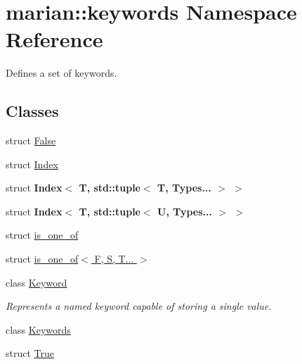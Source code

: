 \hypertarget{namespacemarian_1_1keywords}{}\section{marian\+:\+:keywords Namespace Reference}
\label{namespacemarian_1_1keywords}


Defines a set of keywords.  


\subsection*{Classes}
\begin{DoxyCompactItemize}
\item 
struct \hyperlink{namespacemarian_1_1keywords_d3/d3c/structmarian_1_1keywords_1_1False}{False}
\item 
struct \hyperlink{namespacemarian_1_1keywords_df/dc1/structmarian_1_1keywords_1_1Index}{Index}
\item 
struct {\bfseries Index$<$ T, std\+::tuple$<$ T, Types... $>$ $>$}
\item 
struct {\bfseries Index$<$ T, std\+::tuple$<$ U, Types... $>$ $>$}
\item 
struct \hyperlink{structmarian_1_1keywords_1_1is__one__of}{is\+\_\+one\+\_\+of}
\item 
struct \hyperlink{structmarian_1_1keywords_1_1is__one__of_3_01F_00_01S_00_01T_8_8_8_01_4}{is\+\_\+one\+\_\+of$<$ F, S, T... $>$}
\item 
class \hyperlink{classmarian_1_1keywords_1_1Keyword}{Keyword}
\begin{DoxyCompactList}\small\item\em Represents a named keyword capable of storing a single value. \end{DoxyCompactList}\item 
class \hyperlink{classmarian_1_1keywords_1_1Keywords}{Keywords}
\item 
struct \hyperlink{namespacemarian_1_1keywords_d5/d52/structmarian_1_1keywords_1_1True}{True}
\end{DoxyCompactItemize}
